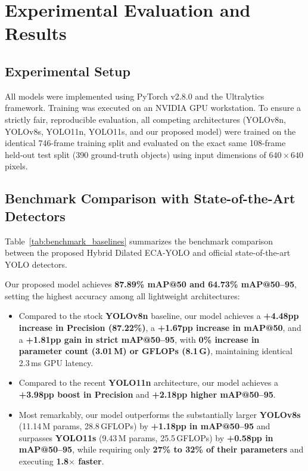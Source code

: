 \documentclass[journal,twoside,web]{ieeecolor}
\begin{document}
\section{Experimental Evaluation and Results}
\label{sec:experiments}

\subsection{Experimental Setup}
All models were implemented using PyTorch v2.8.0 and the Ultralytics framework. Training was executed on an NVIDIA GPU workstation. To ensure a strictly fair, reproducible evaluation, all competing architectures (YOLOv8n, YOLOv8s, YOLO11n, YOLO11s, and our proposed model) were trained on the identical 746-frame training split and evaluated on the exact same 108-frame held-out test split (390 ground-truth objects) using input dimensions of $640\times640$ pixels.

\subsection{Benchmark Comparison with State-of-the-Art Detectors}
Table~\ref{tab:benchmark_baselines} summarizes the benchmark comparison between the proposed Hybrid Dilated ECA-YOLO and official state-of-the-art YOLO detectors. 

Our proposed model achieves \textbf{87.89\% mAP@50 and 64.73\% mAP@50--95}, setting the highest accuracy among all lightweight architectures:
\begin{itemize}
    \item Compared to the stock \textbf{YOLOv8n} baseline, our model achieves a \textbf{+4.48pp increase in Precision (87.22\%)}, a \textbf{+1.67pp increase in mAP@50}, and a \textbf{+1.81pp gain in strict mAP@50--95}, with \textbf{0\% increase in parameter count (3.01\,M) or GFLOPs (8.1\,G)}, maintaining identical 2.3\,ms GPU latency.
    \item Compared to the recent \textbf{YOLO11n} architecture, our model achieves a \textbf{+3.98pp boost in Precision} and \textbf{+2.18pp higher mAP@50--95}.
    \item Most remarkably, our model outperforms the substantially larger \textbf{YOLOv8s} (11.14\,M params, 28.8\,GFLOPs) by \textbf{+1.18pp in mAP@50--95} and surpasses \textbf{YOLO11s} (9.43\,M params, 25.5\,GFLOPs) by \textbf{+0.58pp in mAP@50--95}, while requiring only \textbf{27\% to 32\% of their parameters} and executing \textbf{1.8$\times$ faster}.
\end{itemize}
\end{document}
